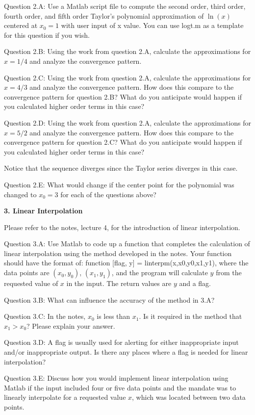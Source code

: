 \documentclass{article}
\def\ds{\displaystyle}
\begin{document}
\par \medskip \noindent
%
Question 2.A: Use a Matlab script file to compute the second order, third order, fourth order, and fifth order Taylor's polynomial approximation of $\ds \ln(x)$ centered at $\ds x_0=1$ with user input of x value. You can use logt.m as a template for this question if you wish. \medskip \par \noindent
%
Question 2.B: Using the work from question 2.A, calculate the approximations for $x=1/4$ and analyze the convergence pattern.  \medskip \par \noindent
%
Question 2.C:  Using the work from question 2.A, calculate the approximations for $x=4/3$ and analyze the convergence pattern. How does this compare to the convergence pattern for question 2.B? What do you anticipate would happen if you calculated higher order terms in this case?  
\medskip \par \noindent
%
Question 2.D: Using the work from question 2.A, calculate the approximations for $x=5/2$ and analyze the convergence pattern. How does this compare to the convergence pattern for question 2.C? What do you anticipate would happen if you calculated higher order terms in this case?  

{\color{teal} Notice that the sequence diverges since the Taylor series diverges in this case.}
\medskip \par \noindent
%
Question 2.E: What would change if the center point for the polynomial was changed to $x_0=3$ for each of the questions above? 
\par \bigskip \par
{\bf 3. Linear Interpolation} \\  \par \medskip \noindent
Please refer to the notes, lecture 4, for the introduction of linear interpolation. 
\par \medskip \noindent
%
Question 3.A: Use Matlab to code up a function that completes the calculation of linear interpolation using the method developed in the notes. Your function should have the format of: function [flag, y] = linterpm(x,x0,y0,x1,y1), where the data points are $\ds (x_0, y_0)$, $\ds (x_1, y_1)$, and the program will calculate $y$ from the requested value of $x$ in the input. The return values are $y$ and a flag. 
\medskip \par \noindent
%
Question 3.B: What can influence the accuracy of the method in 3.A?
  \medskip \par \noindent
%
Question 3.C: In the notes, $\ds x_0$ is less than $\ds x_1$. Is it required in the method that $\ds x_1 > x_0$? Please explain your answer.  
\medskip \par \noindent
%
Question 3.D:  A flag is usually used for alerting for either inappropriate input and/or inappropriate output. Is there any places where a flag is needed for linear interpolation?
\medskip \par \noindent
%
Question 3.E:  Discuss how you would implement linear interpolation using Matlab if the input included four or five data points and the mandate was to linearly interpolate for a requested value $x$, which was located between two data points.
\end{document}
